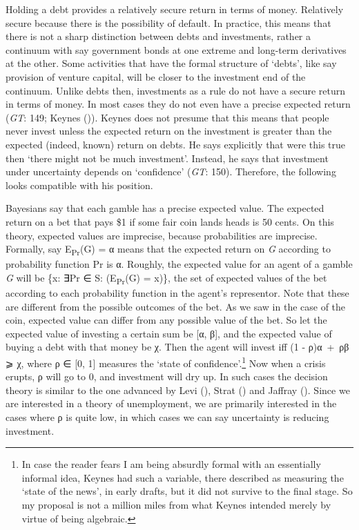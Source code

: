 \documentclass[
  10pt,
  letterpaper,
  DIV=11,
  numbers=noendperiod,
  twoside]{scrartcl}
\begin{document}
Holding a debt provides a relatively secure return in terms of money.
Relatively secure because there is the possibility of default. In
practice, this means that there is not a sharp distinction between debts
and investments, rather a continuum with say government bonds at one
extreme and long-term derivatives at the other. Some activities that
have the formal structure of `debts', like say provision of venture
capital, will be closer to the investment end of the continuum. Unlike
debts then, investments as a rule do not have a secure return in terms
of money. In most cases they do not even have a precise expected return
(\emph{GT}: 149; Keynes ()). Keynes
does not presume that this means that people never invest unless the
expected return on the investment is greater than the expected (indeed,
known) return on debts. He says explicitly that were this true then
`there might not be much investment'. Instead, he says that investment
under uncertainty depends on `confidence' (\emph{GT}: 150). Therefore,
the following looks compatible with his position.

Bayesians say that each gamble has a precise expected value. The
expected return on a bet that pays \$1 if some fair coin lands heads is
50 cents. On this theory, expected values are imprecise, because
probabilities are imprecise. Formally, say E\textsubscript{Pr}(G) = α
means that the expected return on \emph{G} according to probability
function Pr is α. Roughly, the expected value for an agent of a gamble
\emph{G} will be \{x: ∃Pr ∈ S: (E\textsubscript{Pr}(G) = x)\}, the set
of expected values of the bet according to each probability function in
the agent's representor. Note that these are different from the possible
outcomes of the bet. As we saw in the case of the coin, expected value
can differ from any possible value of the bet. So let the expected value
of investing a certain sum be {[}α, β{]}, and the expected value of
buying a debt with that money be χ. Then the agent will invest iff (1 -
ρ)α~+~ρβ ⩾ χ, where ρ ∈ {[}0, 1{]} measures the `state of
confidence'.\footnote{In case the reader fears I am being absurdly
  formal with an essentially informal idea, Keynes had such a variable,
  there described as measuring the `state of the news', in early drafts,
  but it did not survive to the final stage. So my proposal is not a
  million miles from what Keynes intended merely by virtue of being
  algebraic.} Now when a crisis erupts, ρ will go to 0, and investment
will dry up. In such cases the decision theory is similar to the one
advanced by Levi (), Strat
() and Jaffray
(). Since we are interested in a theory
of unemployment, we are primarily interested in the cases where ρ is
quite low, in which cases we can say uncertainty is reducing investment.
\end{document}
